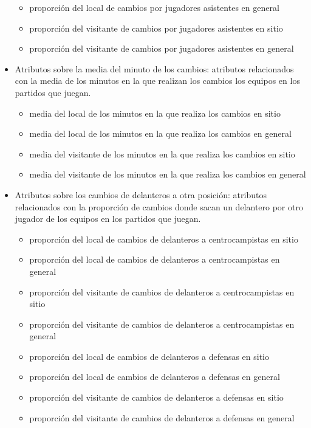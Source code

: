 \begin{itemize}
\begin{itemize}
              \item proporción del local de cambios por jugadores asistentes en general
              \item proporción del visitante de cambios por jugadores asistentes en sitio
              \item proporción del visitante de cambios por jugadores asistentes en general
          \end{itemize}
    \item Atributos sobre la media del minuto de los cambios: atributos relacionados con la media de los minutos en la que realizan los cambios los equipos en los partidos que juegan.
          \begin{itemize}
              \item media del local de los minutos en la que realiza los cambios en sitio
              \item media del local de los minutos en la que realiza los cambios en general
              \item media del visitante de los minutos en la que realiza los cambios en sitio
              \item media del visitante de los minutos en la que realiza los cambios en general
          \end{itemize}
    \item Atributos sobre los cambios de delanteros a otra posición: atributos relacionados con la proporción de cambios donde sacan un delantero por otro jugador de los equipos en los partidos que juegan.
          \begin{itemize}
              \item proporción del local de cambios de delanteros a centrocampistas en sitio
              \item proporción del local de cambios de delanteros a centrocampistas en general
              \item proporción del visitante de cambios de delanteros a centrocampistas en sitio
              \item proporción del visitante de cambios de delanteros a centrocampistas en general
              \item proporción del local de cambios de delanteros a defensas en sitio
              \item proporción del local de cambios de delanteros a defensas en general
              \item proporción del visitante de cambios de delanteros a defensas en sitio
              \item proporción del visitante de cambios de delanteros a defensas en general


\end{itemize}
\end{itemize}
